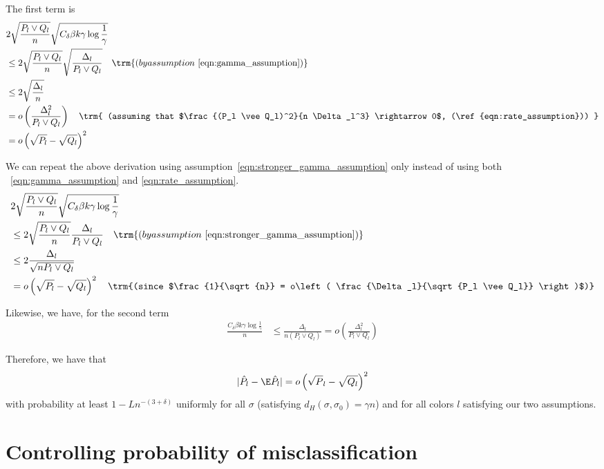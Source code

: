 \documentclass{article}
\begin{document}
The first term is
\begin{align*}
& 2 \sqrt{ \frac{P_l \vee Q_l}{n} } \sqrt{ C_\delta \beta k \gamma \log \frac{1}{\gamma}} \\
&\leq 2 \sqrt{ \frac{P_l \vee Q_l}{n} } \sqrt{ \frac{\Delta_l}{ P_l \vee Q_l }} \quad
\trm{
(by assumption~\ref{eqn:gamma_assumption})
 } \\
&\leq 2 \sqrt{ \frac{\Delta_l}{n} } \\
& = o\left( \frac{\Delta_l^2}{P_l \vee Q_l} \right) \quad \trm{
   (assuming that $\frac{(P_l \vee Q_l)^2}{n \Delta_l^3} \rightarrow 0$, 
     (\ref{eqn:rate_assumption})) 
    } \\
&= o \left( \sqrt{P_l} - \sqrt{Q_l} \right)^2 
\end{align*}

We can repeat the above derivation using assumption~\ref{eqn:stronger_gamma_assumption} only instead of using both ~\ref{eqn:gamma_assumption} and \ref{eqn:rate_assumption}.
\begin{align*}
& 2 \sqrt{ \frac{P_l \vee Q_l}{n} } \sqrt{ C_\delta \beta k \gamma \log \frac{1}{\gamma}} \\
&\leq 2 \sqrt{ \frac{P_l \vee Q_l}{n} }  \frac{\Delta_l}{ P_l \vee Q_l } \quad
\trm{ 
(by assumption~\ref{eqn:stronger_gamma_assumption})
 } \\
&\leq 2 \frac{\Delta_l}{\sqrt{ n P_l \vee Q_l}} \\
&= o \left( \sqrt{P_l} - \sqrt{Q_l} \right)^2 \quad \trm{(since 
$\frac{1}{\sqrt{n}} = o\left( \frac{\Delta_l}{\sqrt{P_l \vee Q_l}} \right)$)}
\end{align*}


Likewise, we have, for the second term
\begin{align*}
  \frac{C_\delta \beta k \gamma \log \frac{1}{\gamma}}{n}  &\leq
 \frac{\Delta_l}{n (P_l \vee Q_l)} = o \left( \frac{\Delta_l^2}{P_l \vee Q_l} \right)
\end{align*}

Therefore, we have that
\begin{align}
| \hat{P}_l - \E \hat{P}_l | = o \left( \sqrt{P}_l - \sqrt{Q_l} \right)^2
\label{eqn:Pl_variance}
\end{align}
with probability at least $1 - L n^{-(3+\delta)}$ uniformly for all $\sigma$ (satisfying $d_H(\sigma, \sigma_0) = \gamma n$) and for all colors $l$ satisfying our two assumptions.

\newpage
\section{Controlling probability of misclassification}
\label{sec:misclassify}
\end{document}
